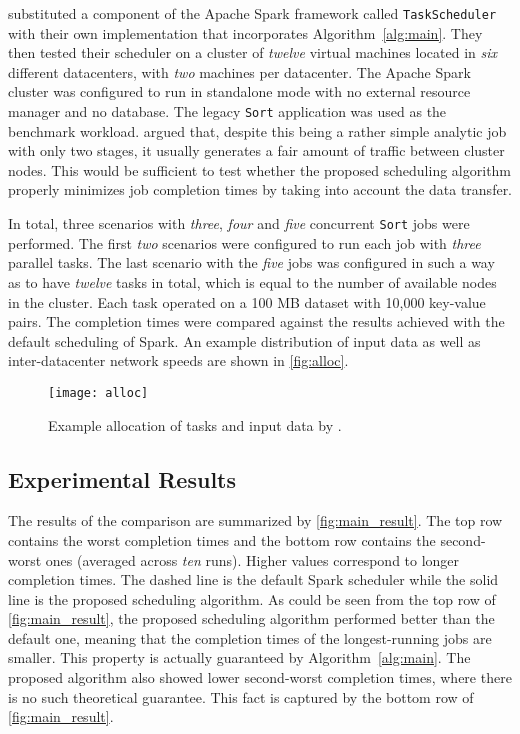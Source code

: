 \citet*{Chen2017} substituted a component of the Apache Spark framework called \texttt{TaskScheduler} with their own implementation that incorporates Algorithm~\ref{alg:main}. They then tested their scheduler on a cluster of \emph{twelve} virtual machines located in \emph{six} different datacenters, with \emph{two} machines per datacenter. The Apache Spark cluster was configured to run in standalone mode with no external resource manager and no database. The legacy \texttt{Sort} application was used as the benchmark workload. \citet{Chen2017} argued that, despite this being a rather simple analytic job with only two stages, it usually generates a fair amount of traffic between cluster nodes. This would be sufficient to test whether the proposed scheduling algorithm properly minimizes job completion times by taking into account the data transfer.

In total, three scenarios with \emph{three}, \emph{four} and \emph{five} concurrent \texttt{Sort} jobs were performed. The first \emph{two} scenarios were configured to run each job with \emph{three} parallel tasks. The last scenario with the \emph{five} jobs was configured in such a way as to have \emph{twelve} tasks in total, which is equal to the number of available nodes in the cluster. Each task operated on a 100 MB dataset with 10,000 key-value pairs. The completion times were compared against the results achieved with the default scheduling of Spark. An example distribution of input data as well as inter-datacenter network speeds are shown in \autoref{fig:alloc}.

\begin{figure}
  \centering
  \texttt{[image: alloc]} \\
  \caption{Example allocation of tasks and input data by \citet{Chen2017}.}
  \label{fig:alloc}
\end{figure}


\subsection{Experimental Results}

The results of the comparison are summarized by \autoref{fig:main_result}. The top row contains the worst completion times and the bottom row contains the second-worst ones (averaged across \emph{ten} runs). Higher values correspond to longer completion times. The dashed line is the default Spark scheduler while the solid line is the proposed scheduling algorithm. As could be seen from the top row of \autoref{fig:main_result}, the proposed scheduling algorithm performed better than the default one, meaning that the completion times of the longest-running jobs are smaller. This property is actually guaranteed by Algorithm~\ref{alg:main}. The proposed algorithm also showed lower second-worst completion times, where there is no such theoretical guarantee. This fact is captured by the bottom row of \autoref{fig:main_result}.

